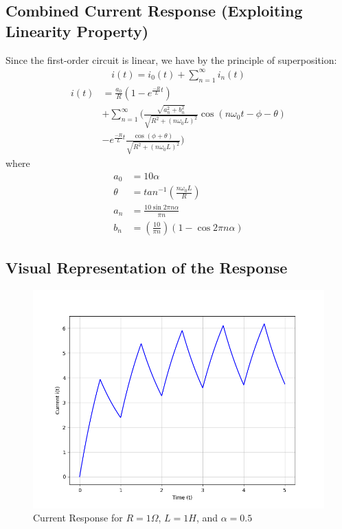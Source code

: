 \begin{multicols}{2}
\subsection{Combined Current Response (Exploiting Linearity Property)}
Since the first-order circuit is linear, we have by the principle of superposition:
 \begin{align}
        i(t) = i_0(t)+ \sum_{n=1}^{\infty}i_n(t)
\end{align}
\begin{align}
i(t) &= \frac{a_0}{R} \left(1-e^{\frac{-R}{L}t} \right) \\
&+ \sum_{n=1}^{\infty} \Bigg( \frac{\sqrt{a_n^2+b_n^2}}{\sqrt{R^2+(n\omega_0L)^2}} \cos(n\omega_0t-\phi-\theta) \\
&- e^{\frac{-R}{L}t} \frac{\cos(\phi+\theta)}{\sqrt{R^2+(n\omega_0L)^2}} \Bigg)
\end{align}
where
\begin{align*}
    a_0&=10\alpha\\
    \theta&=tan^{-1}\left(\frac{n\omega_0L}{R}\right)\\
    a_n&=\frac{10 \sin 2 \pi n \alpha}{\pi n} \\
    b_n&=\left( \frac{10}{ \pi n} \right) (1 - \cos 2 \pi n \alpha)
\end{align*}


\subsection{Visual Representation of the Response}
\begin{figure}[H]
  \centering
  \includegraphics[width=\columnwidth]{sections/3_plot.png}
  \caption{Current Response for $R=1\Omega$, $L=1H$, and $\alpha=0.5$}
  \end{figure}
\end{multicols}
